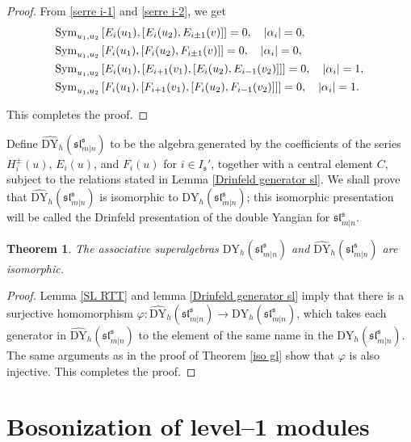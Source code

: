 \documentclass[a4paper,12pt]{article}
\newtheorem{theo}{{Theorem}}[section]
\numberwithin{equation}{section}
\begin{document}
\begin{proof}
From \eqref{serre  i-1} and \eqref{serre i-2}, we get
\begin{align*}
&{\rm Sym}_{u_{1},u_{2}}\left[E_{i}(u_{1}),\left[E_{i}(u_{2}),E_{i\pm 1}(v)\right]\right]=0,\quad |\alpha_{i}|=0,\\
&{\rm Sym}_{u_{1},u_{2}}\left[F_{i}(u_{1}),\left[F_{i}(u_{2}),F_{i\pm 1}(v)\right]\right]=0,\quad |\alpha_{i}|=0,\\
&{\rm Sym}_{u_{1},u_{2}}\left[E_{i}(u_{1}),\left[E_{i+1}(v_{1}),\left[E_{i}(u_{2}),
E_{i-1}(v_{2})\right]\right]\right]=0,\quad |\alpha_{i}|=1,\\
&{\rm Sym}_{u_{1},u_{2}}\left[F_{i}(u_{1}),\left[F_{i+1}(v_{1}),\left[F_{i}(u_{2}),
F_{i-1}(v_{2})\right]\right]\right]=0,\quad |\alpha_{i}|=1.
\end{align*}

This completes the proof.
\end{proof}

Define $\widehat{\mathrm{DY}}_{h}(\mathfrak{sl}^{\mathfrak{s}}_{m|n})$ to be the algebra generated by the coefficients of the series $H_{i}^{\pm}(u)$, $E_{i}(u)$, and $F_{i}(u)$ for $i\in I_{\mathfrak{s}}'$, together with a central element $C$, subject to the relations stated in Lemma \ref{Drinfeld generator sl}. We shall prove that $\widehat{\mathrm{DY}}_{h}(\mathfrak{sl}^{\mathfrak{s}}_{m|n})$ is isomorphic to $\mathrm{DY}_{h}(\mathfrak{sl}^{\mathfrak{s}}_{m|n})$; this isomorphic presentation will be called the Drinfeld presentation of the double Yangian for $\mathfrak{sl}^{\mathfrak{s}}_{m|n}$.

\begin{theo}\label{Iso-sl}
The associative superalgebras $\mathrm{DY}_{h}(\mathfrak{sl}^{\mathfrak{s}}_{m|n})$ and $\widehat{\mathrm{DY}}_{h}(\mathfrak{sl}^{\mathfrak{s}}_{m|n})$ are isomorphic.
\end{theo}
\begin{proof}
Lemma \ref{SL RTT} and lemma \ref{Drinfeld generator sl} imply that there is a surjective homomorphism $\varphi:\widehat{\mathrm{DY}}_{h}(\mathfrak{sl}^{\mathfrak{s}}_{m|n})\rightarrow \mathrm{DY}_{h}(\mathfrak{sl}^{\mathfrak{s}}_{m|n})$, which takes each generator in $\widehat{\mathrm{DY}}_{h}(\mathfrak{sl}^{\mathfrak{s}}_{m|n})$ to the element of the same name in the $\mathrm{DY}_{h}(\mathfrak{sl}^{\mathfrak{s}}_{m|n})$. The same arguments as in the proof of Theorem \ref{iso gl} show that $\varphi$ is also injective. This completes the proof.
\end{proof}

\section{Bosonization of level--1 modules}
\end{document}
